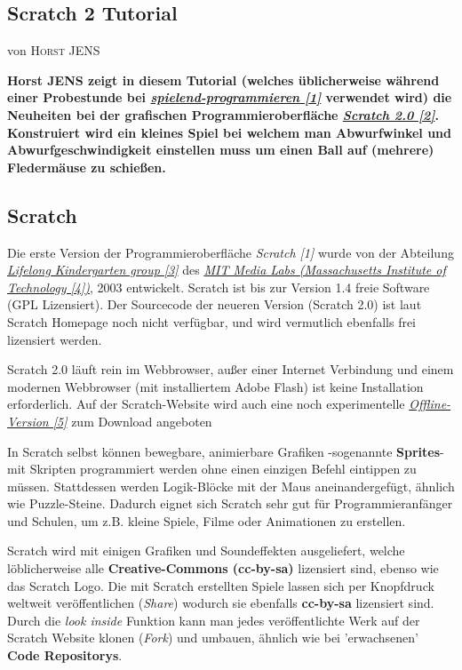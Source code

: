 \documentclass[10pt,a4paper,ngerman,twoside]{article} %
\newcommand{\NewsItem}[1]{ %
\usefont{T1}{fvs}{n}{n} %
\vspace{24pt}\large #1\vspace{3pt} %
\par \normalsize \normalfont}
\newcommand{\NewsAuthor}[1]{ %
\hfill von \textsc{#1} \vspace{20pt} %
\par \normalfont}
\begin{document}
\begin{multicols}{3}
\NewsItem{}
\section*{Scratch 2 Tutorial}
\label{scratch}
\NewsAuthor{Horst JENS}

\textbf{Horst JENS zeigt in diesem Tutorial (welches üblicherweise während einer Probestunde bei \href{http://spielend-programmieren.at}{\textit{spielend-programmieren [1]}} verwendet wird) die Neuheiten bei der grafischen Programmieroberfläche \href{http://scratch.mit.ed}{\textit{Scratch 2.0 [2]}}. Konstruiert wird ein kleines Spiel bei welchem man Abwurfwinkel und Abwurfgeschwindigkeit einstellen muss um einen Ball auf (mehrere) Fledermäuse zu schießen.}

\subsection*{Scratch}

Die erste Version der Programmieroberfläche \textit{Scratch [1]} wurde von der Abteilung \href{http://llk.media.mit.edu/}{\textit{Lifelong Kindergarten group [3]}} des \href{http://www.media.mit.edu/}{\textit{MIT Media Labs (Massachusetts Institute of Technology [4])}},  2003 entwickelt. Scratch ist bis zur Version 1.4 freie Software (GPL Lizensiert). Der Sourcecode der neueren Version (Scratch 2.0) ist laut Scratch Homepage noch nicht verfügbar, und wird vermutlich ebenfalls frei lizensiert werden. 

Scratch 2.0 läuft rein im Webbrowser, außer einer Internet Verbindung und einem modernen Webbrowser (mit installiertem Adobe Flash) ist keine Installation erforderlich. Auf der Scratch-Website wird auch eine noch experimentelle \href{http://scratch.mit.edu/scratch2download/}{\textit{Offline-Version [5]}} zum Download angeboten

In Scratch selbst können bewegbare, animierbare Grafiken -sogenannte \textbf{Sprites}- mit Skripten programmiert werden ohne einen einzigen Befehl eintippen zu müssen. Stattdessen werden Logik-Blöcke mit der Maus aneinandergefügt, ähnlich wie Puzzle-Steine. Dadurch eignet sich Scratch sehr gut für Programmieranfänger und Schulen, um z.B. kleine Spiele, Filme oder Animationen zu erstellen. 

Scratch wird mit einigen Grafiken und Soundeffekten ausgeliefert, welche löblicherweise alle \textbf{Creative-Commons (cc-by-sa)} lizensiert sind, ebenso wie das Scratch Logo. Die mit Scratch erstellten Spiele lassen sich per Knopfdruck weltweit veröffentlichen (\textit{Share}) wodurch sie ebenfalls \textbf{cc-by-sa} lizensiert sind. Durch die \textit{look inside} Funktion kann man jedes veröffentlichte Werk auf der Scratch Website klonen (\textit{Fork}) und umbauen, ähnlich wie bei 'erwachsenen' \textbf{Code Repositorys}.



\end{multicols}
\end{document}

